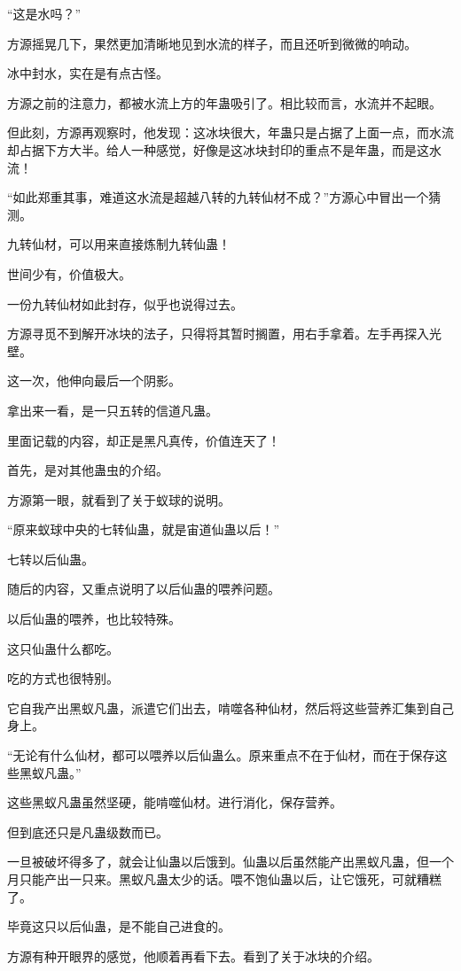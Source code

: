 \begin{this_body}
“这是水吗？”

方源摇晃几下，果然更加清晰地见到水流的样子，而且还听到微微的响动。

冰中封水，实在是有点古怪。

方源之前的注意力，都被水流上方的年蛊吸引了。相比较而言，水流并不起眼。

但此刻，方源再观察时，他发现：这冰块很大，年蛊只是占据了上面一点，而水流却占据下方大半。给人一种感觉，好像是这冰块封印的重点不是年蛊，而是这水流！

“如此郑重其事，难道这水流是超越八转的九转仙材不成？”方源心中冒出一个猜测。

九转仙材，可以用来直接炼制九转仙蛊！

世间少有，价值极大。

一份九转仙材如此封存，似乎也说得过去。

方源寻觅不到解开冰块的法子，只得将其暂时搁置，用右手拿着。左手再探入光壁。

这一次，他伸向最后一个阴影。

拿出来一看，是一只五转的信道凡蛊。

里面记载的内容，却正是黑凡真传，价值连天了！

首先，是对其他蛊虫的介绍。

方源第一眼，就看到了关于蚁球的说明。

“原来蚁球中央的七转仙蛊，就是宙道仙蛊以后！”

七转以后仙蛊。

随后的内容，又重点说明了以后仙蛊的喂养问题。

以后仙蛊的喂养，也比较特殊。

这只仙蛊什么都吃。

吃的方式也很特别。

它自我产出黑蚁凡蛊，派遣它们出去，啃噬各种仙材，然后将这些营养汇集到自己身上。

“无论有什么仙材，都可以喂养以后仙蛊么。原来重点不在于仙材，而在于保存这些黑蚁凡蛊。”

这些黑蚁凡蛊虽然坚硬，能啃噬仙材。进行消化，保存营养。

但到底还只是凡蛊级数而已。

一旦被破坏得多了，就会让仙蛊以后饿到。仙蛊以后虽然能产出黑蚁凡蛊，但一个月只能产出一只来。黑蚁凡蛊太少的话。喂不饱仙蛊以后，让它饿死，可就糟糕了。

毕竟这只以后仙蛊，是不能自己进食的。

方源有种开眼界的感觉，他顺着再看下去。看到了关于冰块的介绍。


\end{this_body}
